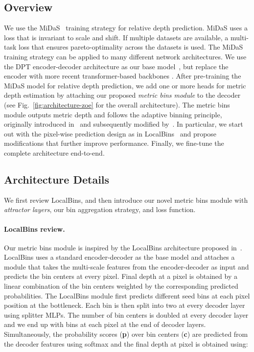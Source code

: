 \documentclass[10pt,twocolumn,letterpaper]{article}
\begin{document}
\subsection{Overview}
We use the MiDaS~\cite{Ranftl2020MiDaS} training strategy for relative depth prediction. MiDaS uses a loss that is invariant to scale and shift. If multiple datasets are available, a multi-task loss that ensures pareto-optimality across the datasets is used. The MiDaS training strategy can be applied to many different network architectures. We use the DPT encoder-decoder architecture as our base model~\cite{Ranftl_2021_ICCV_DPT}, but replace the encoder with more recent transformer-based backbones \cite{DBLP:journals/corr/abs-2106-08254}. 
After pre-training the MiDaS model for relative depth prediction, we add one or more heads for metric depth estimation by attaching our proposed \emph{metric bins module} to the decoder (see Fig.~\ref{fig:architecture-zoe} for the overall architecture). The metric bins module outputs metric depth and follows the adaptive binning principle, originally introduced in~\cite{bhat2021adabins} and subsequently modified by~\cite{bhat2022localbins, li2022binsformer, agarwal2022attention, pixelbinsSarwari:EECS-2021-32}. In particular, we start out with the pixel-wise prediction design as in LocalBins~\cite{bhat2022localbins} and propose modifications that further improve performance. Finally, we fine-tune the complete architecture end-to-end. 

\subsection{Architecture Details}
We first review LocalBins, and then introduce our novel metric bins module with \emph{attractor layers}, our bin aggregation strategy, and loss function.
\paragraph{LocalBins review.} Our metric bins module is inspired by the LocalBins architecture proposed in~\cite{bhat2022localbins}. LocalBins uses a standard encoder-decoder as the base model and attaches a module that takes the multi-scale features from the encoder-decoder as input and predicts the bin centers at every pixel. Final depth at a pixel is obtained by a linear combination of the bin centers weighted by the corresponding predicted probabilities. The LocalBins module first predicts  different seed bins at each pixel position at the bottleneck. Each bin is then split into two at every decoder layer using splitter MLPs. The number of bin centers is doubled at every decoder layer and we end up with  bins at each pixel at the end of  decoder layers. Simultaneously, the probability scores (\textbf{p}) over  bin centers (\textbf{c}) are predicted from the decoder features using softmax and the final depth at pixel  is obtained using:
\end{document}
